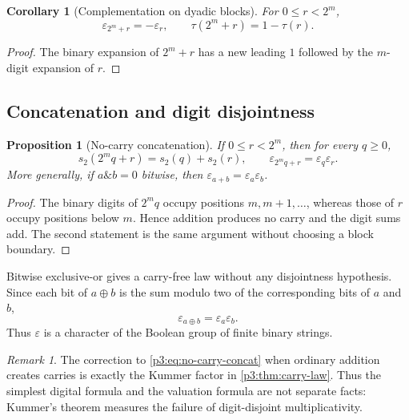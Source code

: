 \documentclass[11pt,oneside]{article}
\newtheorem{proposition}[theorem]{Proposition}
\newtheorem{corollary}[theorem]{Corollary}
\theoremstyle{definition}
\theoremstyle{remark}
\newtheorem{remark}[theorem]{Remark}
\newcommand{\bitsum}{s_2}
\newcommand{\eps}{\varepsilon}
\newcommand{\xor}{\mathbin{\oplus}}
\begin{document}
\begin{corollary}[Complementation on dyadic blocks]\label{p3:cor:block-complement}
For $0\le r<2^m$,
\begin{equation}\label{p3:eq:block-complement}
  \eps_{2^m+r}=-\eps_r,
  \qquad
  \tau(2^m+r)=1-\tau(r).
\end{equation}
\end{corollary}

\begin{proof}
The binary expansion of $2^m+r$ has a new leading $1$ followed by the
$m$-digit expansion of $r$.
\end{proof}

\subsection{Concatenation and digit disjointness}

\begin{proposition}[No-carry concatenation]\label{p3:prop:no-carry-concat}
If $0\le r<2^m$, then for every $q\ge0$,
\begin{equation}\label{p3:eq:no-carry-concat}
 \bitsum(2^mq+r)=\bitsum(q)+\bitsum(r),
 \qquad
 \eps_{2^mq+r}=\eps_q\eps_r.
\end{equation}
More generally, if $a\mathbin{\&}b=0$ bitwise, then
$\eps_{a+b}=\eps_a\eps_b$.
\end{proposition}

\begin{proof}
The binary digits of $2^mq$ occupy positions $m,m+1,\ldots$, whereas those of
$r$ occupy positions below $m$.  Hence addition produces no carry and the
digit sums add.  The second statement is the same argument without choosing a
block boundary.
\end{proof}

Bitwise exclusive-or gives a carry-free law without any disjointness
hypothesis.  Since each bit of $a\xor b$ is the sum modulo two of the
corresponding bits of $a$ and $b$,
\begin{equation}\label{p3:eq:xor-character}
 \boxed{\qquad \eps_{a\xor b}=\eps_a\eps_b.\qquad}
\end{equation}
Thus $\eps$ is a character of the Boolean group of finite binary strings.

\begin{remark}
The correction to \cref{p3:eq:no-carry-concat} when ordinary addition creates
carries is exactly the Kummer factor in \cref{p3:thm:carry-law}.  Thus the
simplest digital formula and the valuation formula are not separate facts:
Kummer's theorem measures the failure of digit-disjoint multiplicativity.
\end{remark}
\end{document}
